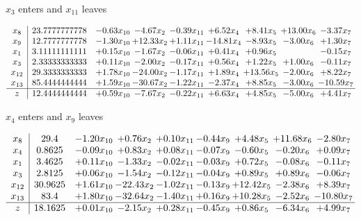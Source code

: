 \documentclass[8pt]{article}
\begin{document}
 $ x_{3} $ enters and $ x_{11} $ leaves 

 \[\begin{array}{c| c c@{\hskip 2pt} c@{\hskip 2pt} c@{\hskip 2pt} c@{\hskip 2pt} c@{\hskip 2pt} c@{\hskip 2pt} c@{\hskip 2pt} }
 x_{8}   &  23.7777777778 & -0.63 x_{10} & -4.67 x_{2} & -0.39 x_{11} & +  6.52 x_{4} & +  8.41 x_{5} & + 13.00 x_{6} & -3.37 x_{7}\\
 x_{9}   &  12.7777777778 & -1.30 x_{10} & + 12.33 x_{2} & +  1.11 x_{11} & -14.81 x_{4} & -8.93 x_{5} & -3.00 x_{6} & +  1.30 x_{7}\\
 x_{1}   &  3.11111111111 & +  0.15 x_{10} & -1.67 x_{2} & -0.06 x_{11} & +  0.41 x_{4} & +  0.96 x_{5} &   & -0.15 x_{7}\\
 x_{3}   &  2.33333333333 & +  0.11 x_{10} & -2.00 x_{2} & -0.17 x_{11} & +  0.56 x_{4} & +  1.22 x_{5} & +  1.00 x_{6} & -0.11 x_{7}\\
 x_{12}   &  29.3333333333 & +  1.78 x_{10} & -24.00 x_{2} & -1.17 x_{11} & +  1.89 x_{4} & + 13.56 x_{5} & -2.00 x_{6} & +  8.22 x_{7}\\
 x_{13}   &  85.4444444444 & +  1.59 x_{10} & -30.67 x_{2} & -1.22 x_{11} & -2.37 x_{4} & +  8.85 x_{5} & -3.00 x_{6} & -10.59 x_{7}\\
\hline
z    &  12.4444444444 & +  0.59 x_{10} & -7.67 x_{2} & -0.22 x_{11} & +  6.63 x_{4} & +  4.85 x_{5} & -5.00 x_{6} & +  4.41 x_{7}\\
\end{array}\]


 $ x_{4} $ enters and $ x_{9} $ leaves 

 \[\begin{array}{c| c c@{\hskip 2pt} c@{\hskip 2pt} c@{\hskip 2pt} c@{\hskip 2pt} c@{\hskip 2pt} c@{\hskip 2pt} c@{\hskip 2pt} }
 x_{8}   &  29.4 & -1.20 x_{10} & +  0.76 x_{2} & +  0.10 x_{11} & -0.44 x_{9} & +  4.48 x_{5} & + 11.68 x_{6} & -2.80 x_{7}\\
 x_{4}   &  0.8625 & -0.09 x_{10} & +  0.83 x_{2} & +  0.08 x_{11} & -0.07 x_{9} & -0.60 x_{5} & -0.20 x_{6} & +  0.09 x_{7}\\
 x_{1}   &  3.4625 & +  0.11 x_{10} & -1.33 x_{2} & -0.02 x_{11} & -0.03 x_{9} & +  0.72 x_{5} & -0.08 x_{6} & -0.11 x_{7}\\
 x_{3}   &  2.8125 & +  0.06 x_{10} & -1.54 x_{2} & -0.12 x_{11} & -0.04 x_{9} & +  0.89 x_{5} & +  0.89 x_{6} & -0.06 x_{7}\\
 x_{12}   &  30.9625 & +  1.61 x_{10} & -22.43 x_{2} & -1.02 x_{11} & -0.13 x_{9} & + 12.42 x_{5} & -2.38 x_{6} & +  8.39 x_{7}\\
 x_{13}   &  83.4 & +  1.80 x_{10} & -32.64 x_{2} & -1.40 x_{11} & +  0.16 x_{9} & + 10.28 x_{5} & -2.52 x_{6} & -10.80 x_{7}\\
\hline
z    &  18.1625 & +  0.01 x_{10} & -2.15 x_{2} & +  0.28 x_{11} & -0.45 x_{9} & +  0.86 x_{5} & -6.34 x_{6} & +  4.99 x_{7}\\
\end{array}\]
\end{document}
